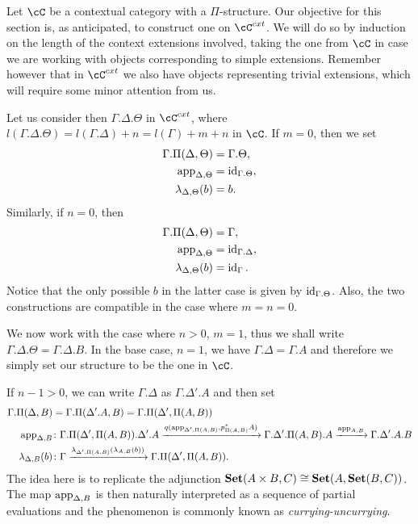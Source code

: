 \documentclass[a4paper,fontsize=12pt]{scrartcl}
\begin{document}
\begin{construction}
  Let $\cC$ be a contextual category with a $\Pi$-structure. Our objective for
  this section is, as anticipated, to construct one on $\cC^{cxt}$. We will do
  so by induction on the length of the context extensions involved, taking the
  one from $\cC$ in case we are working with objects corresponding to simple
  extensions. Remember however that in $\cC^{cxt}$ we also have objects
  representing trivial extensions, which will require some minor attention from
  us.

  Let us consider then $\Gamma.\Delta.\Theta$ in $\cC^{cxt}$, where
  $l(\Gamma.\Delta.\Theta)=l(\Gamma.\Delta)+n=l(\Gamma)+m+n$ in $\cC$. If
  $m=0$, then we set
  \begin{align*}
    \Gamma.\Pi(\Delta,\Theta) &=\Gamma.\Theta, \\
    \operatorname{app}_{\Delta,\Theta} &=\operatorname{id}_{\Gamma.\Theta}, \\
    \lambda_{\Delta,\Theta}(b) &=b.
  \end{align*}
  Similarly, if $n=0$, then
  \begin{align*}
    \Gamma.\Pi(\Delta,\Theta) &=\Gamma, \\
    \operatorname{app}_{\Delta,\Theta} &=\operatorname{id}_{\Gamma.\Delta}, \\
    \lambda_{\Delta,\Theta}(b) &=\operatorname{id}_\Gamma.
  \end{align*}
  Notice that the only possible $b$ in the latter case is given by
  $\operatorname{id}_{\Gamma.\Theta}$. Also, the two constructions are compatible in the case
  where $m=n=0$.

  We now work with the case where $n>0$, $m=1$, thus we shall write
  $\Gamma.\Delta.\Theta=\Gamma.\Delta.B$. In the base case, $n=1$, we have
  $\Gamma.\Delta=\Gamma.A$ and therefore we simply set our structure to be the
  one in $\cC$.

  If $n-1>0$, we can write
  $\Gamma.\Delta$ as $\Gamma.\Delta'.A$ and then set
  \begin{align*}
    \Gamma.\Pi(\Delta,B)
    &=\Gamma.\Pi(\Delta'.A,B)=\Gamma.\Pi(\Delta',\Pi(A,B)) \\
    \operatorname{app}_{\Delta,B} &\colon
                    \Gamma.\Pi(\Delta',\Pi(A,B)).\Delta'.A
                    \xrightarrow{q(\operatorname{app}_{\Delta',\Pi(A,B)},p^*_{\Pi(A,B)}A)}\Gamma.\Delta'.\Pi(A,B).A
                    \xrightarrow{\operatorname{app}_{A,B}}\Gamma.\Delta'.A.B \\
    \lambda_{\Delta,B}(b)
    &\colon
    \Gamma
    \xrightarrow{\lambda_{\Delta',\Pi(A,B)}(\lambda_{A,B}(b))}
    \Gamma.\Pi(\Delta',\Pi(A,B)).
  \end{align*}
  The idea here is to replicate the adjunction $\operatorname{\mathbf{Set}}(A\times
  B,C)\cong\operatorname{\mathbf{Set}}(A,\operatorname{\mathbf{Set}}(B,C))$. The map $\operatorname{app}_{\Delta,B}$ is then naturally
  interpreted as a sequence of partial evaluations and the phenomenon is
  commonly known as \emph{currying-uncurrying}.


\end{construction}
\end{document}
